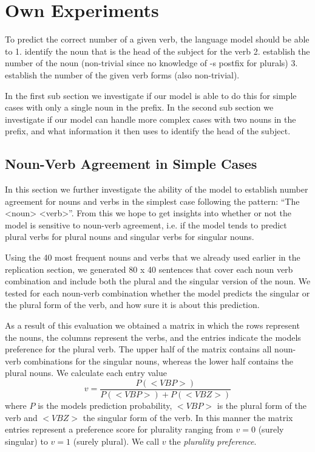 \section{Own Experiments}
\label{own-experiments}
To predict the correct number of a given verb,
the language model should be able to
1. identify the noun that is the head of the subject for the verb
2. establish the number of the noun (non-trivial since no knowledge of -s postfix for plurals)
3. establish the number of the given verb forms (also non-trivial).

In the first sub section we investigate if our model is able to
do this for simple cases with only a single noun in the prefix.
%
In the second sub section we investigate if our model can handle
more complex cases with two nouns in the prefix,
and what information it then uses to identify the head of the subject.


\subsection{Noun-Verb Agreement in Simple Cases}

In this section we further investigate the ability of the model to
establish number agreement for nouns and verbs in the simplest case
following the pattern: ``The <noun> <verb>''. 
From this we hope to get insights into whether or not the model is sensitive to noun-verb agreement, i.e. if the model tends to predict plural verbs for plural nouns and singular verbs for singular nouns.

Using the 40 most frequent nouns and verbs that we already used earlier in the replication section, we generated 80 x 40 sentences that cover each noun verb combination and include both the plural and the singular version of the noun. 
We tested for each noun-verb combination whether the model 
predicts the singular or the plural form of the verb,
and how sure it is about this prediction.


As a result of this evaluation we obtained a matrix in which 
the rows represent the nouns,
the columns represent the verbs, and
the entries indicate the models preference for the plural verb. 
The upper half of the matrix contains all noun-verb combinations for the singular nouns, whereas the lower half contains the plural nouns. 
We calculate each entry value
\begin{equation}
	v = \frac{P(<VBP>)}{P(<VBP>) + P(<VBZ>)} 
\end{equation}
where $P$ is the models prediction probability, $<VBP>$ is the plural 
form of the verb and $<VBZ>$ the singular form of the verb. In this manner the matrix entries represent 
a preference score for plurality ranging from
$v=0$ (surely singular) to $v=1$ (surely plural). 
We call $v$ the \textit{plurality preference}. 

